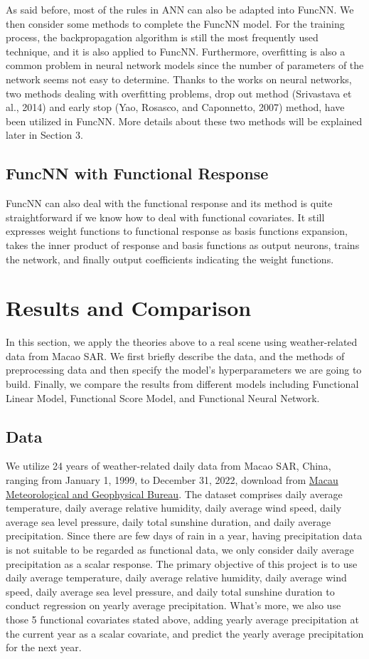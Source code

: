 As said before, most of the rules in ANN can also be adapted into FuncNN. We then consider some methods to complete the FuncNN model. For the training process, the backpropagation algorithm is still the most frequently used technique, and it is also applied to FuncNN. Furthermore, overfitting is also a common problem in neural network models since the number of parameters of the network seems not easy to determine. Thanks to the works on neural networks, two methods dealing with overfitting problems, drop out method (Srivastava et al., 2014) and early stop (Yao, Rosasco, and Caponnetto, 2007) method, have been utilized in FuncNN. More details about these two methods will be explained later in Section 3. 

\subsection{FuncNN with Functional Response}
FuncNN can also deal with the functional response and its method is quite straightforward if we know how to deal with functional covariates. It still expresses weight functions to functional response as basis functions expansion, takes the inner product of response and basis functions as output neurons, trains the network, and finally output coefficients indicating the weight functions.

\section{Results and Comparison}
In this section, we apply the theories above to a real scene using weather-related data from Macao SAR. We first briefly describe the data, and the methods of preprocessing data and then specify the model's hyperparameters we are going to build. Finally, we compare the results from different models including Functional Linear Model, Functional Score Model, and Functional Neural Network. 

\subsection{Data}
We utilize 24 years of weather-related daily data from Macao SAR, China, ranging from January 1, 1999, to December 31, 2022, download from \href{https://www.smg.gov.mo}{Macau Meteorological and Geophysical Bureau}. The dataset comprises daily average temperature, daily average relative humidity, daily average wind speed, daily average sea level pressure, daily total sunshine duration, and daily average precipitation.
Since there are few days of rain in a year, having precipitation data is not suitable to be regarded as functional data, we only consider daily average precipitation as a scalar response. The primary objective of this project is to use daily average temperature, daily average relative humidity, daily average wind speed, daily average sea level pressure, and daily total sunshine duration to conduct regression on yearly average precipitation. What’s more, we also use those 5 functional covariates stated above, adding yearly average precipitation at the current year as a scalar covariate, and predict the yearly average precipitation for the next year.

